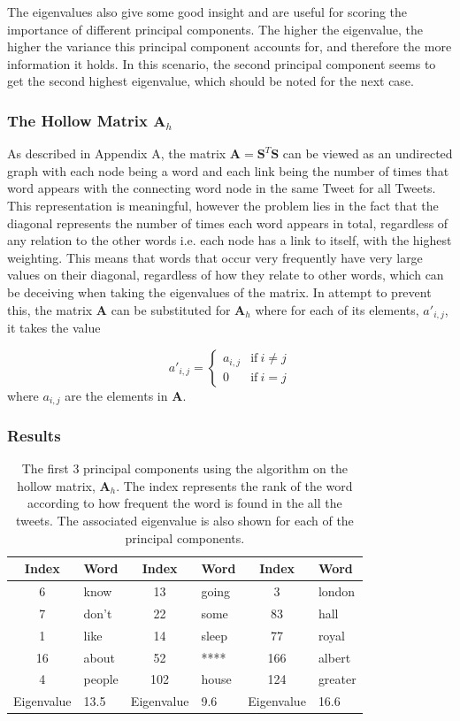 \documentclass[11pt,a4paper]{article}
\begin{document}
The eigenvalues also give some good insight and are useful for scoring the importance of different principal components. The higher the eigenvalue, the higher the variance this principal component accounts for, and therefore the more information it holds. In this scenario, the second principal component seems to get the second highest eigenvalue, which should be noted for the next case. 
  
\subsubsection{The Hollow Matrix $\mathbf{A}_{h}$}
As described in Appendix A, the matrix $\mathbf{A} = \mathbf{S}^T \mathbf{S}$ can be viewed as an undirected graph with each node being a word and each link being the number of times that word appears with the connecting word node in the same Tweet for all Tweets. This representation is meaningful, however the problem lies in the fact that the diagonal represents the number of times each word appears in total, regardless of any relation to the other words i.e. each node has a link to itself, with the highest weighting. This means that words that occur very frequently have very large values on their diagonal, regardless of how they relate to other words, which can be deceiving when taking the eigenvalues of the matrix. In attempt to prevent this, the matrix $\mathbf{A}$ can be substituted for 
$\mathbf{A}_h$ where for each of its elements, $a'_{i, j}$, it takes the value 

\begin{equation}
a'_{i, j} = 
\begin{cases}
a_{i, j} & \text{if}\ i \neq j\\
0 & \text{if}\ i = j
\end{cases}
\end{equation}
where $a_{i, j}$ are the elements in $\mathbf{A}$.

\subsubsection*{Results}
\begin{table}[H]
\center
\begin{tabular}{| c l | c l | c l |}
\hline
Index & Word & Index & Word & Index & Word\\
\hline
6 & know & 13 & going & 3 & london\\
7 & don't & 22 & some & 83 & hall\\
1 & like & 14 & sleep & 77 & royal\\
16 & about & 52 & **** & 166 & albert\\
4 & people & 102 & house & 124 & greater\\
\hline
Eigenvalue & 13.5 & Eigenvalue & 9.6 & Eigenvalue & 16.6\\
\hline
\end{tabular}
\caption{The first 3 principal components using the algorithm on the hollow matrix, $ \mathbf{A}_h$. The index represents the rank of the word according to how frequent the word is found in the all the tweets. The associated eigenvalue is also shown for each of the principal components.}
\end{table}
\end{document}
